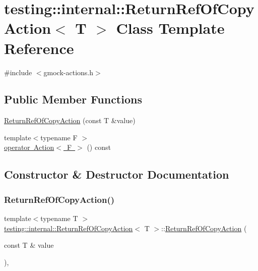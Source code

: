 \hypertarget{classtesting_1_1internal_1_1ReturnRefOfCopyAction}{}\section{testing\+::internal\+::Return\+Ref\+Of\+Copy\+Action$<$ T $>$ Class Template Reference}
\label{classtesting_1_1internal_1_1ReturnRefOfCopyAction}


{\ttfamily \#include $<$gmock-\/actions.\+h$>$}

\subsection*{Public Member Functions}
\begin{DoxyCompactItemize}
\item 
\mbox{\hyperlink{classtesting_1_1internal_1_1ReturnRefOfCopyAction_a073c18a8b50423b08f6603e860622839}{Return\+Ref\+Of\+Copy\+Action}} (const T \&value)
\item 
{\footnotesize template$<$typename F $>$ }\\\mbox{\hyperlink{classtesting_1_1internal_1_1ReturnRefOfCopyAction_a8b4829fbb46c3ca6468f3eb5c5b42493}{operator Action$<$ F $>$}} () const
\end{DoxyCompactItemize}


\subsection{Constructor \& Destructor Documentation}
\mbox{\label{classtesting_1_1internal_1_1ReturnRefOfCopyAction_a073c18a8b50423b08f6603e860622839}} 
\subsubsection{\texorpdfstring{ReturnRefOfCopyAction()}{ReturnRefOfCopyAction()}}
{\footnotesize\ttfamily template$<$typename T $>$ \\
\mbox{\hyperlink{classtesting_1_1internal_1_1ReturnRefOfCopyAction}{testing\+::internal\+::\+Return\+Ref\+Of\+Copy\+Action}}$<$ T $>$\+::\mbox{\hyperlink{classtesting_1_1internal_1_1ReturnRefOfCopyAction}{Return\+Ref\+Of\+Copy\+Action}} (\begin{DoxyParamCaption}\item[{const T \&}]{value }\end{DoxyParamCaption})\hspace{0.3cm}{\ttfamily [inline]}, {\ttfamily [explicit]}}



